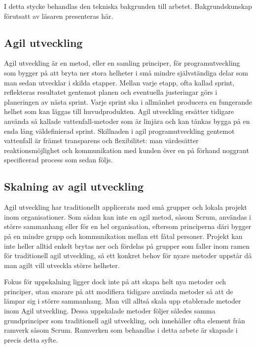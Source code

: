 	I detta stycke behandlas den tekniska bakgrunden till arbetet. Bakgrundskunskap förutsatt av läsaren presenteras här.
	
	\subsection{Agil utveckling}
	
		Agil utveckling är en metod, eller en samling principer, för programutveckling som bygger på att bryta ner stora helheter i små mindre självständiga delar som man sedan utvecklar i skilda etapper. Mellan varje etapp, ofta kallad sprint, reflekteras resultatet gentemot planen och eventuella justeringar görs i planeringen av nästa sprint. Varje sprint ska i allmänhet producera en fungerande helhet som kan läggas till huvudprodukten. Agil utveckling ersätter tidigare använda så kallade vattenfall-metoder som är linjära och kan tänkas bygga på en enda lång väldefinierad sprint. Skillnaden i agil programutveckling gentemot vattenfall är främst transparens och flexibilitet: man värdesätter reaktionsmöjlighet och kommunikation med kunden över en på förhand noggrant specificerad process som sedan följs. \cite{agile_manifesto}
		

	\subsection{Skalning av agil utveckling}
		
		Agil utveckling har traditionellt applicerats med små grupper och lokala projekt inom organisationer. Som sådan kan inte en agil metod, såsom Scrum, användas i större sammanhang eller för en hel organisation, eftersom principerna däri bygger på en mindre grupp och kommunikation mellan ett fåtal personer. Projekt kan inte heller alltid enkelt brytas ner och fördelas på grupper som faller inom ramen för traditionell agil utveckling, så ett konkret behov för nyare metoder uppstår då man agilt vill utveckla större helheter.
		
		Fokus för uppskalning ligger dock inte på att skapa helt nya metoder och principer, utan snarare på att modifiera tidigare använda metoder så att de lämpar sig i större sammanhang. Man vill alltså skala upp etablerade metoder inom Agil utveckling. Dessa uppskalade metoder följer således samma grundprinciper som traditionell agil utveckling, och innehåller ofta element från ramverk såsom Scrum. Ramverken som behandlas i detta arbete är skapade i precis detta syfte.
		
